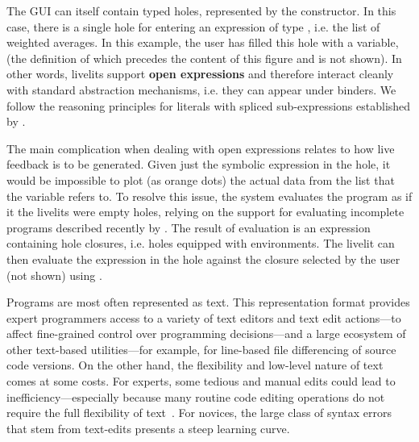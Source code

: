 The GUI can itself contain typed holes, represented by the  constructor. In this case, there is a single hole
for entering an expression of type , i.e. the list of weighted
averages. In this example, the user has filled this hole with a variable,
 (the definition of which precedes the content of this figure and is not shown). In other words,
livelits support \textbf{open expressions} and therefore interact cleanly with 
standard abstraction mechanisms, i.e. they can appear under binders. We follow the reasoning principles for literals with spliced sub-expressions established  by \citet{DBLP:journals/pacmpl/OmarA18}.

The main complication when dealing with open expressions relates to how live feedback
is to be generated. Given just the symbolic expression in the hole, it would be 
impossible to plot (as orange dots) the actual data from the list that the variable refers to. To resolve this issue, the system evaluates the program 
as if it the livelits were empty holes, 
relying on the support for evaluating incomplete programs described recently 
by \citet{DBLP:journals/pacmpl/OmarVCH19}. The result of evaluation is an expression containing
hole closures, i.e. holes equipped with environments. 
The livelit 
can then evaluate the expression in the hole against the closure selected by the user (not shown) using .



Programs are most often represented as text.
%
This representation format provides expert programmers access to a variety of
text editors and text edit actions---to affect fine-grained control over
programming decisions---and a large ecosystem of other text-based
utilities---for example, for line-based file differencing of source code
versions.
%
On the other hand, the flexibility and low-level nature of text comes at some
costs.
%
For experts, some tedious and manual edits could lead to
inefficiency---especially because many routine code editing operations do not
require the full flexibility of text~\citep{XXX}.
%
For novices, the large class of syntax errors that stem from text-edits presents
a steep learning curve.


